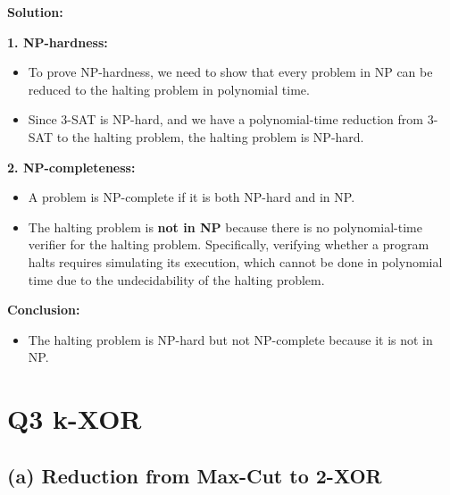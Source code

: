 \documentclass[11pt]{article}
\newenvironment{solution}{%
    \par\noindent\textbf{Solution:}\par%
}{\par}
\begin{document}
\begin{solution}
\textbf{1. NP-hardness:}
\begin{itemize}
    \item To prove NP-hardness, we need to show that every problem in NP can be reduced to the halting problem in polynomial time.
    \item Since 3-SAT is NP-hard, and we have a polynomial-time reduction from 3-SAT to the halting problem, the halting problem is NP-hard.
\end{itemize}

\textbf{2. NP-completeness:}
\begin{itemize}
    \item A problem is NP-complete if it is both NP-hard and in NP.
    \item The halting problem is \textbf{not in NP} because there is no polynomial-time verifier for the halting problem. Specifically, verifying whether a program halts requires simulating its execution, which cannot be done in polynomial time due to the undecidability of the halting problem.
\end{itemize}

\textbf{Conclusion:}
\begin{itemize}
    \item The halting problem is NP-hard but not NP-complete because it is not in NP.
\end{itemize}
\end{solution}

\newpage

\section*{Q3 k-XOR}

\subsection*{(a) Reduction from Max-Cut to 2-XOR}
\end{document}
